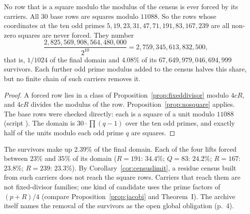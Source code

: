 \begin{corollary}\label{cor:censuslimit}
No row that is a square modulo the modulus of the census is ever forced by its carriers. All $30$ base rows are squares modulo $11088$. So the rows whose coordinates at the ten odd primes $5,19,23,31,47,71,191,83,167,239$ are all non-zero squares are never forced. They number
\[
\frac{2{,}825{,}569{,}908{,}564{,}480{,}000}{2^{10}}=2{,}759{,}345{,}613{,}832{,}500,
\]
that is, $1/1024$ of the final domain and $4.08\%$ of its $67{,}649{,}979{,}046{,}694{,}999$ survivors. Each further odd prime modulus added to the census halves this share, but no finite chain of such carriers removes it.
\end{corollary}
\begin{proof}
A forced row lies in a class of Proposition~\ref{prop:fixeddivisor} modulo $4cR$, and $4cR$ divides the modulus of the row. Proposition~\ref{prop:nosquare} applies. The base rows were checked directly: each is a square of a unit modulo $11088$ (script ). The domain is $30\cdot\prod(q-1)$ over the ten odd primes, and exactly half of the units modulo each odd prime $q$ are squares.
\end{proof}

The survivors make up $2.39\%$ of the final domain. Each of the four lifts forced between $23\%$ and $35\%$ of its domain ($R=191$: $34.4\%$; $Q=83$: $24.2\%$; $R=167$: $23.8\%$; $R=239$: $23.3\%$). By Corollary~\ref{cor:censuslimit}, a residue census built from such carriers does not reach the square rows. Carriers that reach them are not fixed-divisor families; one kind of candidate uses the prime factors of $(p+R)/4$ (compare Proposition~\ref{prop:jacobi} and Theorem~I). The archive itself names the removal of the survivors as the open global obligation (p.~4).

